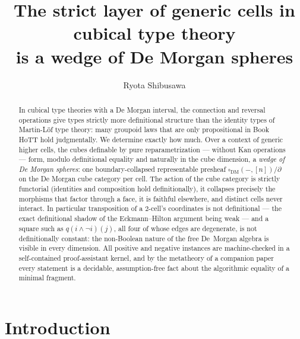 \documentclass[11pt]{amsart}
\theoremstyle{definition}
\newcommand{\Dbox}{\square_{\mathrm{DM}}}
\begin{document}
\title[The strict layer of cubical type theory]{The strict layer of
  generic cells in cubical type theory\\ is a wedge of De Morgan
  spheres}

\author{Ryota Shibusawa}
\address{Daiichi Institute of Technology, Japan}


\begin{abstract}
  In cubical type theories with a De Morgan interval, the connection
  and reversal operations give types strictly more definitional
  structure than the identity types of Martin-L\"of type theory: many
  groupoid laws that are only propositional in Book HoTT hold
  judgmentally.  We determine exactly how much.  Over a context of
  generic higher cells, the cubes definable by pure reparametrization
  --- without Kan operations --- form, modulo definitional equality
  and naturally in the cube dimension, a \emph{wedge of De Morgan
  spheres}: one boundary-collapsed representable presheaf
  $\Dbox(-,[n])/\partial$ on the De Morgan cube category per cell.
  The action of the cube category is strictly functorial (identities
  and composition hold definitionally), it collapses precisely the
  morphisms that factor through a face, it is faithful elsewhere, and
  distinct cells never interact.  In particular transposition of a
  $2$-cell's coordinates is not definitional --- the exact
  definitional shadow of the Eckmann--Hilton argument being weak ---
  and a square such as $q(i \wedge \neg i)(j)$, all four of whose
  edges are degenerate, is not definitionally constant: the
  non-Boolean nature of the free De~Morgan algebra is visible in
  every dimension.  All positive and negative instances are
  machine-checked in a self-contained proof-assistant kernel, and by
  the metatheory of a companion paper every statement is a decidable,
  assumption-free fact about the algorithmic equality of a minimal
  fragment.
\end{abstract}

\maketitle

\section{Introduction}
\label{sec:intro}
\end{document}
